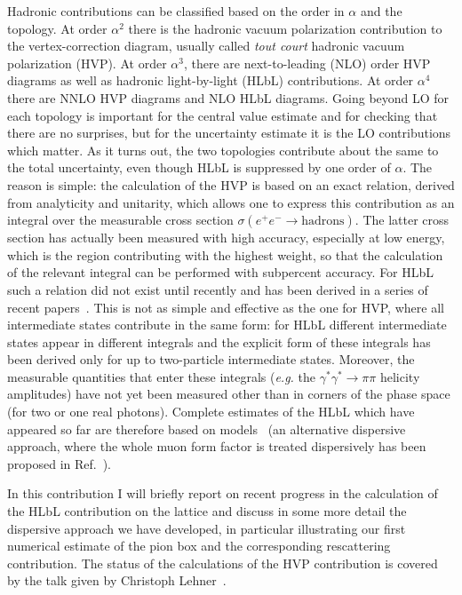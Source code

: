 \documentclass[epj]{webofc}
\newcommand{\<}{\langle}
\renewcommand{\>}{\rangle}
\begin{document}
Hadronic contributions can be classified based on the order in $\alpha$ and
the topology. At order $\alpha^2$ there is the hadronic vacuum polarization
contribution to the vertex-correction diagram, usually called {\em tout
  court} hadronic vacuum polarization (HVP). At order $\alpha^3$, there are
next-to-leading (NLO) order HVP diagrams as well as hadronic light-by-light
(HLbL) contributions. At order $\alpha^4$ there are NNLO HVP diagrams and
NLO HLbL diagrams. Going beyond LO for each topology is important for the
central value estimate and for checking that there are no surprises, but
for the uncertainty estimate it is the LO contributions which matter. As it
turns out, the two topologies contribute about the same to the total
uncertainty, even though HLbL is suppressed by one order of $\alpha$. The
reason is simple: the calculation of the HVP is based on an exact
relation, derived from analyticity and unitarity, which allows one to
express this contribution as an integral over the measurable cross section
$\sigma(e^+ e^- \to \mbox{hadrons})$. The latter cross section has actually
been measured with high accuracy, especially at low energy, which is the
region contributing with the highest weight, so that the calculation of the
relevant integral can be performed with subpercent accuracy. For HLbL
such a relation did not exist until recently and has been derived in a
series of recent
papers~\cite{Colangelo:2014dfa,Colangelo:2014pva,Colangelo:2015ama,Colangelo:2017qdm,Colangelo:2017fiz}.
This is not as simple and effective as the one for HVP, where all intermediate
states contribute in the same form: for HLbL different intermediate states
appear in different integrals and the explicit form of these integrals has
been derived only for up to two-particle intermediate states. Moreover, the
measurable quantities that enter these integrals ({\em e.g.} the $\gamma^*
\gamma^* \to \pi \pi$ helicity amplitudes) have not yet been
measured other than in corners of the phase space (for two or one real
photons). Complete estimates of the HLbL which have appeared so far are
therefore based on models~\cite{Bijnens:1995xf,Bijnens:2001cq,Hayakawa:1995ps,Hayakawa:1996ki,Hayakawa:1997rq,Melnikov:2003xd}
(an alternative dispersive approach, where the whole muon form factor
is treated dispersively has been proposed in Ref.~\cite{Pauk:2014rfa}).

In this contribution I will briefly report on recent progress in the
calculation of the HLbL contribution on the lattice and discuss in some
more detail the dispersive approach we have developed, in particular
illustrating our first numerical estimate of the pion box and the
corresponding rescattering contribution. The status of the calculations 
of the HVP contribution is covered by the talk given by Christoph
Lehner~\cite{LehnerLat17}. 
\end{document}
